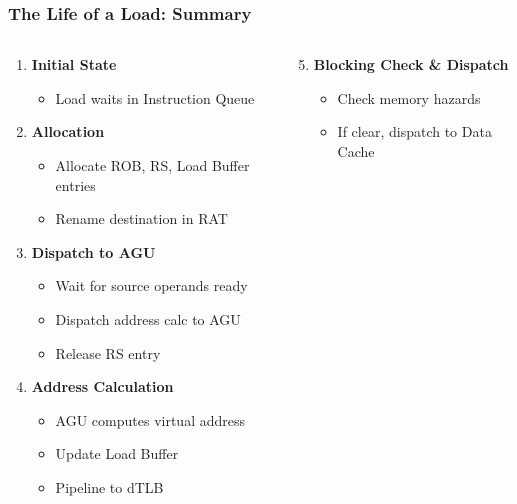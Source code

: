 \documentclass[aspectratio=169,12pt]{beamer}
\begin{document}
\begin{frame}
\frametitle{The Life of a Load: Summary}
\small
\vspace{-6mm}
\begin{columns}[T]
\begin{column}{0.52\textwidth}
\begin{enumerate}
    \item \textbf{Initial State}
    \vspace{-2mm}
    \begin{itemize}
        \item Load waits in Instruction Queue
    \end{itemize}

    \item \textbf{Allocation}
    \vspace{-2mm}
    \begin{itemize}
        \item Allocate ROB, RS, Load Buffer entries
        \item Rename destination in RAT
    \end{itemize}

    \item \textbf{Dispatch to AGU}
    \vspace{-2mm}
    \begin{itemize}
        \item Wait for source operands ready
        \item Dispatch address calc to AGU
        \item Release RS entry
    \end{itemize}

    \item \textbf{Address Calculation}
    \vspace{-2mm}
    \begin{itemize}
        \item AGU computes virtual address
        \item Update Load Buffer
        \item Pipeline to dTLB
    \end{itemize}
\end{enumerate}
\end{column}

\begin{column}{0.52\textwidth}
\begin{enumerate}
    \setcounter{enumi}{4}
    \item \textbf{Blocking Check \& Dispatch}
    \vspace{-2mm}
    \begin{itemize}
        \item Check memory hazards
        \item If clear, dispatch to Data Cache
    \end{itemize}


\end{enumerate}
\end{column}
\end{columns}
\end{frame}
\end{document}
